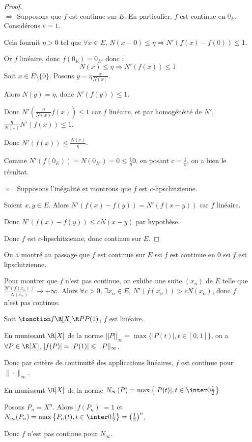 \begin{proof}~\\
    $\Rightarrow$ Supposons que $f$ est continue sur $E$. En particulier, $f$ est 
    continue en $0_E$. Considérons $\varepsilon = 1$.

    Cela fournit $\eta > 0$ tel que $\forall x \in E, \, N(x - 0) \leqslant \eta \Rightarrow N'(f(x) - f(0)) \leqslant 1$.

    Or $f$ linéaire, donc $f(0_E) = 0_{E'}$ donc :
    \[N(x) \leqslant \eta \Rightarrow N'(f(x)) \leqslant 1\]
    Soit $x \in E \setminus \{0\}$. 
    Posons $\displaystyle y = \eta \frac {x}{N(x)} $.

    Alors $N(y) = \eta$, donc $N'(f(y)) \leqslant 1$.

    Donc $N'\left( \frac{\eta }{N(x)} f(x) \right) \leqslant 1$ car $f$ linéaire, 
    et par homogénéité de $N'$, $ \frac{\eta }{N(x)} N'(f(x)) \leqslant 1$.

    Donc $N'(f(x)) \leqslant \frac{N(x)}{\eta}$.

    Comme $N'(f(0_E)) = N(0_{E'}) = 0 \leqslant \frac 1 \eta 0 $, 
    en posant $c = \frac 1 \eta$, on a bien le résultat. 

    \lvspace $\Leftarrow$ Supposons l'inégalité et montrons que $f$ est $c$-lipschitzienne. 

    Soient $x, y \in E$. Alors $N'(f(x) - f(y)) = N'(f(x - y)) $ car $f$ linéaire.

    Donc $N'(f(x) - f(y)) \leqslant c N(x - y)$ par hypothèse. 

    Donc $f$ est $c$-lipschitzienne, donc continue sur $E$.
\end{proof}

\begin{remarque}
    On a montré au passage que $f$ est continue sur $E$ ssi $f$ est continue en $0$ ssi $f$ est lipschitzienne.  

    Pour montrer que $f$ n'est pas continue, on exhibe une suite $(x_n)$ de $E$ 
    telle que $\displaystyle \frac{N'(f(x_n))}{N(x_n)} \to + \infty$. Alors $\forall c > 0, \, \exists x_n \in E, \, N'(f(x_n)) > c N(x_n)$, 
    donc $f$ n'est pas continue.
\end{remarque}

\begin{exemple}
    Soit $\fonction f {\R[X]} \R P {P(1)}$, $f$ est linéaire. 

    \avspace En munissant $\R[X]$ de la norme $||P||_\infty = \max\{|P(t)|, t \in [0, 1]\}$, on a 
    $\forall P \in \R[X], \, |f(P)| = |P(1)| \leqslant ||P||_\infty$.

    Donc par critère de continuité des applications linéaires, $f$ est continue pour $\|\cdot\|_{\infty}$.

    \avspace En munissant $\R[X]$ de la norme $N_\infty(P) = \max\left\{|P(t)|, t \in \inter 0 {\frac 1 2}\right\}$

    Posons $P_n = X^n$. Alors $| f(P_n) | = 1$ et $N_\infty(P_n) = \max\left\{P_n(t), t \in \inter 0 {\frac 1 2}\right\} = \left(\frac 1 2\right)^n$.

    Donc $f$ n'est pas continue pour $N_{\infty}$.
\end{exemple}

